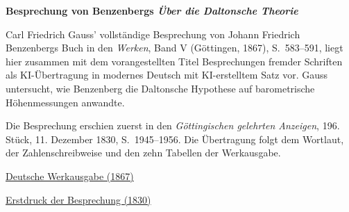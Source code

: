 \clearpage
\thispagestyle{empty}
\begin{center}\Large\textbf{Besprechung von Benzenbergs \textit{Über die Daltonsche Theorie}}\end{center}

Carl Friedrich Gauss’ vollständige Besprechung von Johann Friedrich Benzenbergs Buch in den \textit{Werken}, Band V (Göttingen, 1867), S.~583--591, liegt hier zusammen mit dem vorangestellten Titel Besprechungen fremder Schriften als KI-Übertragung in modernes Deutsch mit KI-erstelltem Satz vor. Gauss untersucht, wie Benzenberg die Daltonsche Hypothese auf barometrische Höhenmessungen anwandte.

Die Besprechung erschien zuerst in den \textit{Göttingischen gelehrten Anzeigen}, 196. Stück, 11. Dezember 1830, S.~1945--1956. Die Übertragung folgt dem Wortlaut, der Zahlenschreibweise und den zehn Tabellen der Werkausgabe.

\medskip\noindent
\href{https://gdz.sub.uni-goettingen.de/id/PPN236006339}{Deutsche Werkausgabe (1867)}\par
\noindent\href{https://gdz.sub.uni-goettingen.de/id/PPN385030444_1830_3}{Erstdruck der Besprechung (1830)}
\clearpage
